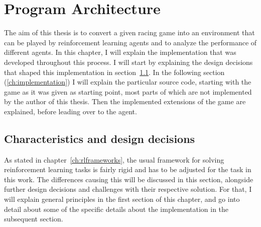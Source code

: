 \chapter{Program Architecture}

\label{ch:program}

\newcommand{\term}[1] {{\spaceskip=.95\fontdimen2\font minus \fontdimen4\font
	\xspaceskip=0pt\relax \large\texttt{#1}}}

\renewcommand{\inlinecode}[1]{\colorbox{red}{\lstinline[basicstyle=\ttfamily\color{black}]{#1}}}


\newcommand{\codefunc}[1]{\colorbox{evenmorelightgray}{\lstinline[basicstyle=\ttfamily\color{black},keywordstyle=\ttfamily]{#1}}}

\newcommand{\codeobj}[1]{\colorbox{evenmorelightgray}{{\spaceskip=.95\fontdimen2\font minus \fontdimen4\font	\xspaceskip=0pt\relax \large\texttt{#1}}}}

\newcommand{\codeother}[1]{\colorbox{evenmorelightgray}{\lstinline[basicstyle=\ttfamily\color{black},keywordstyle=\ttfamily]{#1}}}


\newcommand{\filename}[1] {{\spaceskip=.95\fontdimen2\font minus \fontdimen4\font
		\xspaceskip=0pt\relax \large\texttt{#1}}}


The aim of this thesis is to convert a given racing game into an environment that can be played by reinforcement learning agents and to analyze the performance of different agents. In this chapter, I will explain the implementation that was developed throughout this process. I will start by explaining the design decisions that shaped this implementation in section~\ref{ch:projectcharacteristicschap}. In the following section (\ref{ch:implementation}) I will explain the particular source code, starting with the game as it was given as starting point, most parts of which are not implemented by the author of this thesis. Then the implemented extensions of the game are explained, before leading over to the agent. 

\section{Characteristics and design decisions}

\label{ch:projectcharacteristicschap}

As stated in chapter~\ref{ch:rlframeworks}, the usual framework for solving reinforcement learning tasks is fairly rigid and has to be adjusted for the task in this work. The differences causing this will be discussed in this section, alongside further design decisions and challenges with their respective solution. For that, I will explain general principles in the first section of this chapter, and go into detail about some of the specific details about the implementation in the subsequent section.

